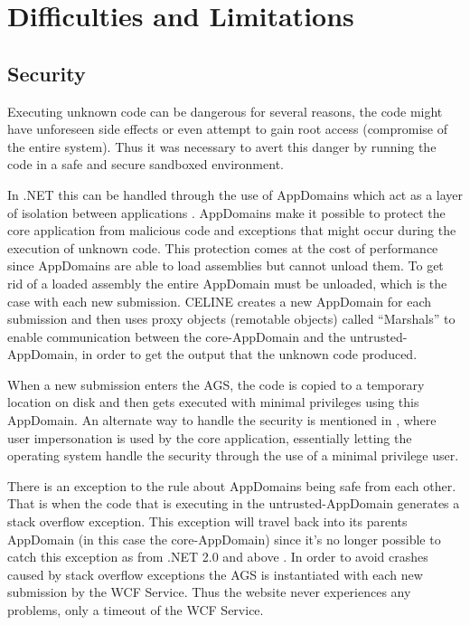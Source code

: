 \section{Difficulties and Limitations}

\subsection{Security} \label{subsec:security}
Executing unknown code can be dangerous for several reasons, the code might have unforeseen side effects or even attempt to gain root access (compromise of the entire system). Thus it was necessary to avert this danger by running the code in a safe and secure sandboxed environment.

In .NET this can be handled through the use of AppDomains which act as a layer of isolation between applications \cite{ApplicationDomains}. AppDomains make it possible to protect the core application from malicious code and exceptions that might occur during the execution of unknown code. This protection comes at the cost of performance since AppDomains are able to load assemblies but cannot unload them. To get rid of a loaded assembly the entire AppDomain must be unloaded, which is the case with each new submission. CELINE creates a new AppDomain for each submission and then uses proxy objects (remotable objects) called ``Marshals'' \cite{Marshals} to enable communication between the core-AppDomain and the untrusted-AppDomain, in order to get the output that the unknown code produced. 

When a new submission enters the AGS, the code is copied to a temporary location on disk and then gets executed with minimal privileges using this AppDomain. An alternate way to handle the security is mentioned in \cite{Suleman}, where user impersonation is used by the core application, essentially letting the operating system handle the security through the use of a minimal privilege user.

There is an exception to the rule about AppDomains being safe from each other. That is when the code that is executing in the untrusted-AppDomain generates a stack overflow exception. This exception will travel back into its parents AppDomain (in this case the core-AppDomain) since it's no longer possible to catch this exception as from .NET 2.0 and above \cite{StackOverflowException}. In order to avoid crashes caused by stack overflow exceptions the AGS is instantiated with each new submission by the WCF Service. Thus the website never experiences any problems, only a timeout of the WCF Service.


